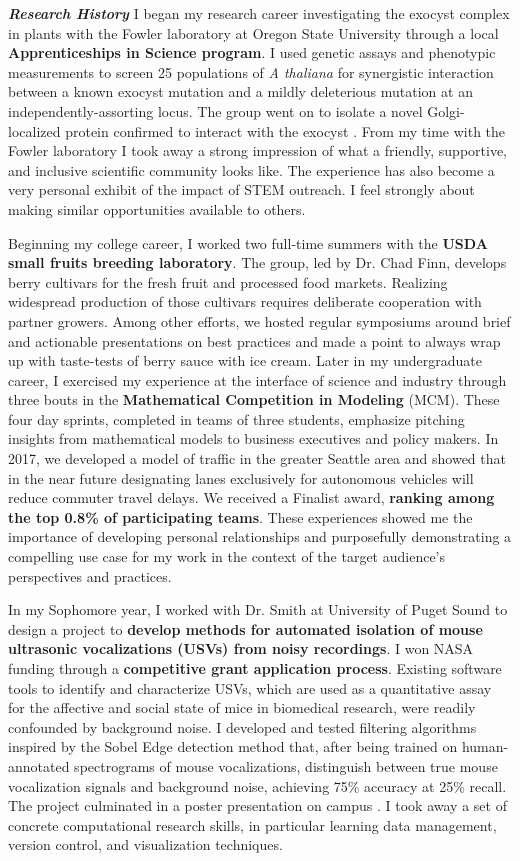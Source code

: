 \textit{\textbf{Research History}}
I began my research career investigating the exocyst complex in plants with the Fowler laboratory at Oregon State University through a local \textbf{
Apprenticeships in Science program}.
I used genetic assays and phenotypic measurements to screen 25 populations of \textit{A thaliana} for synergistic interaction between a known exocyst mutation and a mildly deleterious mutation at an independently-assorting locus.
The group went on to isolate a novel Golgi-localized protein confirmed to interact with the exocyst \cite{fowler}.
From my time with the Fowler laboratory I took away a strong impression of what a friendly, supportive, and inclusive scientific community looks like.
The experience has also become a very personal exhibit of the impact of STEM outreach.
I feel strongly about making similar opportunities available to others.

Beginning my college career, I worked two full-time summers with the \textbf{USDA small fruits breeding laboratory}.
The group, led by Dr. Chad Finn, develops berry cultivars for the fresh fruit and processed food markets.
Realizing widespread production of those cultivars requires deliberate cooperation with partner growers.
Among other efforts, we hosted regular symposiums around brief and actionable presentations on best practices and made a point to always wrap up with taste-tests of berry sauce with ice cream.
Later in my undergraduate career, I exercised my experience at the interface of science and industry through three bouts in the \textbf{Mathematical Competition in Modeling} (MCM).
These four day sprints, completed in teams of three students, emphasize pitching insights from mathematical models to business executives and policy makers.
In 2017, we developed a model of traffic in the greater Seattle area and showed that in the near future designating lanes exclusively for autonomous vehicles will reduce commuter travel delays.
We received a Finalist award, \textbf{ranking among the top 0.8\% of participating teams}.
These experiences showed me the importance of developing personal relationships and purposefully demonstrating a compelling use case for my work in the context of the target audience's perspectives and practices.%

In my Sophomore year, I worked with Dr. Smith at University of Puget Sound to design a project to \textbf{develop methods for automated isolation of mouse
ultrasonic vocalizations (USVs) from noisy recordings}.
I won NASA funding through a \textbf{competitive grant application process}.
Existing software tools to identify and characterize USVs, which are used as a quantitative assay for the affective and social state of mice in biomedical research, were readily confounded by background noise.
I developed and tested filtering algorithms inspired by the Sobel Edge detection method that, after being trained on human-annotated spectrograms of mouse vocalizations, distinguish between true mouse vocalization signals and background noise, achieving 75\% accuracy at 25\% recall.
The project culminated in a poster presentation on campus \cite{smith}.
I took away a set of concrete computational research skills, in particular learning data management, version control, and visualization techniques.

